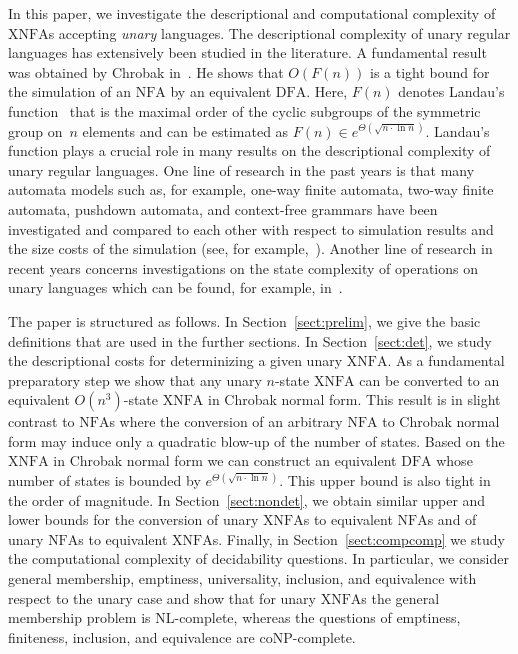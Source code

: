 \documentclass[final,copyright,noderivs]{eptcs}
\theoremstyle{plain}
\theoremstyle{definition}
\newcommand{\dfa}{\textrm{DFA}}
\newcommand{\nfa}{\textrm{NFA}}
\newcommand{\xnfa}{\textrm{XNFA}}
\begin{document}
In this paper, we investigate the descriptional and computational complexity of $\xnfa$s accepting \emph{unary} languages. 
The descriptional complexity of unary regular languages has extensively been studied in the literature.
A fundamental result was obtained by Chrobak in~\cite{Chrobak:1986:FAUL,Chrobak:2003:ERRFAUL}. 
He shows that $O(F(n))$ is a tight bound for the simulation of an $\nfa$ by an equivalent $\dfa$.
Here, $F(n)$ denotes Landau's function~\cite{Landau:1903:mpgg} that is the maximal order of the cyclic subgroups of the 
symmetric group on~$n$ elements and can be estimated as $F(n) \in e^{\Theta(\sqrt{n\cdot\ln n})}$.
Landau's function plays a crucial role in many results on the descriptional complexity of unary regular languages.
One line of research in the past years is that many automata models such as, for example, one-way finite automata, 
two-way finite automata, pushdown automata, and context-free grammars have been investigated and compared
to each other with respect to simulation results and the size costs of the simulation 
(see, for example,~\cite{geffert:2003:ctwnuaisa,Mereghetti:2001:osbua,okhotin:2012:ufau,pighizzini:2009:dpdaul:art,pighizzini:2002:ucfgpdadcaslb}). 
Another line of research in recent years concerns investigations on the state complexity of operations on unary languages
which can be found, for example, in~\mbox{\cite{holzer:2003:ulonsc:proc,kunc:2012:scotwfaua,mera:2005:cunfa,Pighizzini:2002:uloscjf}}. 

The paper is structured as follows. In Section~\ref{sect:prelim}, we give the basic definitions that
are used in the further sections. In Section~\ref{sect:det}, we study the descriptional costs for determinizing
a given unary $\xnfa$. As a fundamental preparatory step we show that any unary $n$-state $\xnfa$ can be converted
to an equivalent $O(n^3)$-state $\xnfa$ in Chrobak normal form. This result is in slight contrast
to $\nfa$s where the conversion of an arbitrary $\nfa$ to Chrobak normal form may induce only a quadratic blow-up
of the number of states. Based on the $\xnfa$ in Chrobak normal form we can construct an equivalent
$\dfa$ whose number of states is bounded by $e^{\Theta(\sqrt{n\cdot\ln n})}$. This upper bound is also
tight in the order of magnitude. In Section~\ref{sect:nondet}, we obtain similar upper and lower bounds for
the conversion of unary $\xnfa$s to equivalent $\nfa$s and of unary $\nfa$s to equivalent $\xnfa$s.
Finally, in Section~\ref{sect:compcomp} we study the computational complexity
of decidability questions. In particular, we consider general membership, emptiness, universality, inclusion,
and equivalence with respect to the unary case and show
that for unary $\xnfa$s the general membership problem 
is {\sf NL}-complete, whereas the questions of emptiness, finiteness,
inclusion, and 
equivalence are {\sf coNP}-complete.
\end{document}

